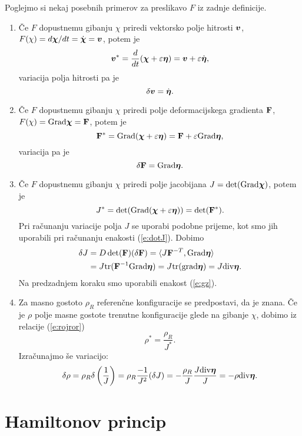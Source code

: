 \begin{primeri}
	Poglejmo si nekaj posebnih primerov za preslikavo $F$ iz zadnje definicije.
	\begin{enumerate}
		\item
			Če $F$ dopustnemu gibanju $\chi$ priredi vektorsko polje hitrosti $\boldsymbol v$,
			$F(\chi)=d\boldsymbol \chi/dt=\dot{\boldsymbol \chi}=\boldsymbol v$, potem je
			\[ \boldsymbol v^*=\frac{d}{dt}(\boldsymbol \chi+\varepsilon\boldsymbol \eta)=\boldsymbol v+\varepsilon\dot{\boldsymbol \eta}, \]
			variacija polja hitrosti pa je
			\[ \delta\boldsymbol v=\dot{\boldsymbol \eta}. \]
		\item
			Če $F$ dopustnemu gibanju $\chi$ priredi polje deformacijskega gradienta $\mathbf F$,
			$F(\chi)=\mathrm{Grad}{\boldsymbol \chi}=\mathbf F$, potem je
			\[ \mathbf F^*=\mathrm{Grad}(\boldsymbol \chi+\varepsilon\boldsymbol \eta)=\mathbf F+\varepsilon\mathrm{Grad}\boldsymbol \eta, \]
			variacija pa je
			\begin{equation} \label{e:deltaF}
				\delta\mathbf F=\mathrm{Grad}\boldsymbol \eta.
			\end{equation}
		\item
			Če $F$ dopustnemu gibanju $\chi$ priredi polje jacobijana
			$J=\det(\mathrm{Grad}\boldsymbol \chi)$, potem je
			\[ J^*=\det(\mathrm{Grad}(\boldsymbol \chi+\varepsilon\boldsymbol \eta))=\det(\mathbf F^*). \]
			Pri računanju variacije polja $J$ se uporabi podobne prijeme,
			kot smo jih uporabili pri računanju enakosti (\ref{e:dotJ}). Dobimo
			\begin{align*}
				\delta J&=D\det(\mathbf F)(\delta\mathbf F)=\langle J\mathbf F^{-T},\mathrm{Grad}\boldsymbol \eta\rangle \\
				&=J\mathrm{tr}(\mathbf F^{-1}\mathrm{Grad}\boldsymbol \eta)=J\mathrm{tr}(\mathrm{grad}\boldsymbol \eta)=J\mathrm{div}\boldsymbol \eta.
			\end{align*}
			Na predzadnjem koraku smo uporabili enakost (\ref{e:gz}).
		\item
			Za masno gostoto $\rho_R$ referenčne konfiguracije se predpostavi, da je znana. Če je
			$\rho$ polje masne gostote trenutne konfiguracije glede na gibanje $\chi$,
			dobimo iz relacije (\ref{e:rojror})
			\[ \rho^*=\frac{\rho_R}{J^*}. \]
			Izračunajmo še variacijo:
			\begin{equation} \label{e:deltarho}
				\delta\rho=\rho_R\delta\left(\frac{1}{J}\right)=
				\rho_R\frac{-1}{J^2}(\delta J)=-\frac{\rho_R}{J}\frac{J\mathrm{div}\boldsymbol \eta}{J}=-\rho\mathrm{div}\boldsymbol \eta.
			\end{equation}
	\end{enumerate}
\end{primeri}


\section{Hamiltonov princip}


